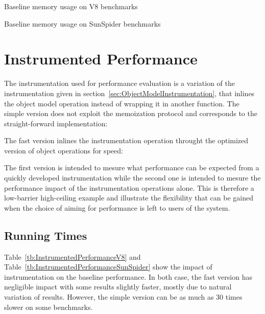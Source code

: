 \begin{table}[htb]
\caption{Baseline memory usage on V8 benchmarks}
\centering
    
\label{tb:BaselineMemoryV8}
\end{table}

\begin{table}[htb]
\caption{Baseline memory usage on SunSpider benchmarks}
\centering
    
\label{tb:BaselineMemorySunSpider}
\end{table}

\newpage
\section{Instrumented Performance}
\label{sec:InstrumentedPerformance}

The instrumentation used for performance evaluation is a variation of the
instrumentation given in section~\ref{sec:ObjectModelInstrumentation}, that
inlines the object model operation instead of wrapping it in another function. 
The simple version does not exploit the memoization protocol and
corresponds to the straight-forward implementation:


The fast version inlines the instrumentation operation throught the optimized
version of object operations for speed:

\newpage
{}



The first version is intended to mesure what performance can be expected from a
quickly developed instrumentation while the second one is intended to mesure
the performance impact of the instrumentation operations alone. This is
therefore a low-barrier high-ceiling example and illustrate the flexibility
that can be gained when the choice of aiming for performance is left to users
of the system.

\subsection{Running Times}

Table~\ref{tb:InstrumentedPerformanceV8} and
Table~\ref{tb:InstrumentedPerformanceSunSpider} show the impact of
instrumentation on the baseline performance. In both case, the fast version has
negligible impact with some results slightly faster, mostly due to natural
variation of results.  However, the simple version can be as much as 30 times
slower on some benchmarks.

